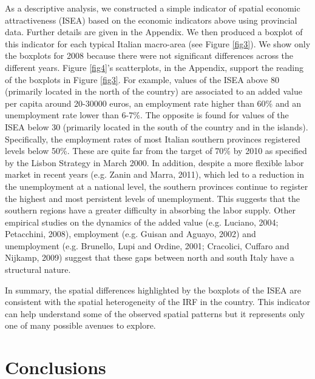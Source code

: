 \documentclass[12pt]{article}
\theoremstyle{definition}
\theoremstyle{plain}
\begin{document}
As a descriptive analysis, we constructed a simple indicator of spatial economic attractiveness (ISEA) based on the economic indicators above using provincial data. Further details are given in the Appendix. We then produced a boxplot of this indicator for each typical Italian macro-area (see Figure \ref{fig3}). We show only the boxplots for 2008 because there were not significant differences across the different years. Figure \ref{fig4}'s scatterplots, in the Appendix, support the reading of the boxplots in Figure \ref{fig3}. For example, values of the ISEA above 80 (primarily located in the north of the country) are associated to an added value per capita around 20-30000 euros, an employment rate higher than 60\% and an unemployment rate lower than 6-7\%. The opposite is found for values of the ISEA below 30 (primarily located in the south of the country and in the islands). Specifically, the employment rates of most Italian southern provinces registered levels below 50\%. These are quite far from the target of 70\% by 2010 as specified by the Lisbon Strategy in March 2000. In addition, despite a more flexible labor market in recent years (e.g. Zanin and Marra, 2011), which led to a reduction in the unemployment at a national level, the southern provinces continue to register the highest and most persistent levels of unemployment. This suggests that the southern regions have a greater difficulty in absorbing the labor supply. Other empirical studies on the dynamics of the added value (e.g. Luciano, 2004; Petacchini, 2008), employment (e.g. Guisan and Aguayo, 2002) and unemployment (e.g. Brunello, Lupi and Ordine, 2001; Cracolici, Cuffaro and Nijkamp, 2009) suggest that these gaps between north and south Italy have a structural nature. 

In summary, the spatial differences highlighted by the boxplots of the ISEA are consistent with the spatial heterogeneity of the IRF in the country. This indicator can help understand some of the observed spatial patterns but it represents only one of many possible avenues to explore.


\section{Conclusions}
\end{document}
